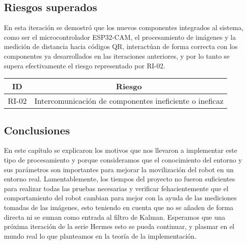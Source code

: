 \subsection{Riesgos superados}

En esta iteración se demostró que los nuevos componentes integrados al sistema, como ser el microcontrolador ESP32-CAM, el procesamiento de imágenes y la medición de distancia hacia códigos QR, interactúan de forma correcta con los componentes ya desarrollados en las iteraciones anteriores, y por lo tanto se supera efectivamente el riesgo representado por RI-02.

\begin{center}
    \begin{tabular} {
        | c| c |}
        \hline \rowcolor{test_header_color}
            ID & Riesgo \\
        \hline
            RI-02 & Intercomunicación de componentes ineficiente o ineficaz \\
        \hline
    \end{tabular}
\end{center}

\subsection{Conclusiones}
En este capítulo se explicaron los motivos que nos llevaron a implementar este tipo de procesamiento y porque consideramos que el conocimiento del entorno y sus parámetros son importantes para mejorar la movilización del robot en un entorno real. Lamentablemente, los tiempos del proyecto no fueron suficientes para realizar todas las pruebas necesarias y verificar fehacientemente que el comportamiento del robot cambian para mejor con la ayuda de las mediciones tomadas de las imágenes, esto teniendo en cuenta que no se añaden de forma directa ni se suman como entrada al filtro de Kalman.
Esperamos que una próxima iteración de la serie Hermes esto se pueda continuar, y plasmar en el mundo real lo que planteamos en la teoría de la implementación.